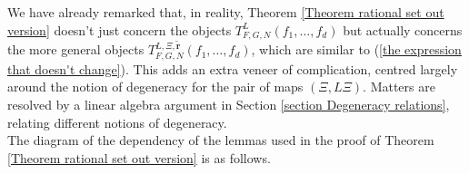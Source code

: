 \documentclass[12pt,a4paper,twoside,reqno]{amsart}
\numberwithin{equation}{section}
\begin{document}
We have already remarked that, in reality, Theorem \ref{Theorem rational set out version} doesn't just concern the objects $T_{F,G,N}^L(f_1,\dots,f_d)$ but actually concerns the more general objects $T_{F,G,N}^{L,\Xi,\widetilde{\mathbf{r}}}(f_1,\dots,f_d)$, which are similar to (\ref{the expression that doesn't change}). This adds an extra veneer of complication, centred largely around the notion of degeneracy for the pair of maps $(\Xi,L\Xi)$. Matters are resolved by a linear algebra argument in Section \ref{section Degeneracy relations}, relating different notions of degeneracy. \\

The diagram of the dependency of the lemmas used in the proof of Theorem \ref{Theorem rational set out version} is as follows. 
 
\end{document}
